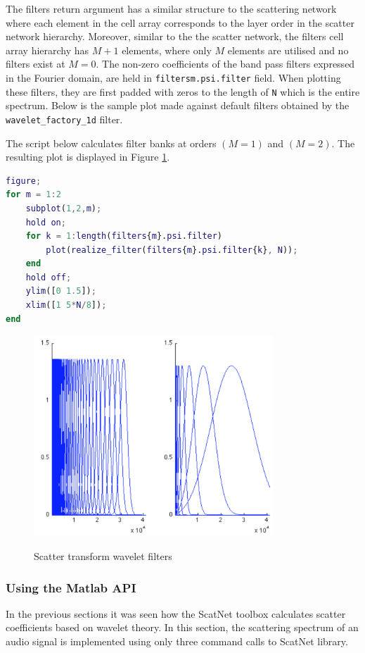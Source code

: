 The filters return argument has a similar structure to the scattering network where each element in the cell array corresponds to the layer order in the scatter network hierarchy. Moreover, similar to the the scatter network, the filters cell array hierarchy has $M+1$ elements, where only $M$ elements are utilised and no filters exist at $M=0$. The non-zero coefficients of the band pass filters expressed in the Fourier domain, are held in \texttt{filters{m}.psi.filter} field. When plotting these filters, they are first padded with zeros to the length of \texttt{N} which is the entire spectrum.  Below is the sample plot made against default filters obtained by the \texttt{wavelet\_factory\_1d} filter.

The script below calculates filter banks at orders $(M = 1)$ and $(M = 2)$.  The resulting plot is displayed in Figure \ref{fig_c3_wplot}.

\begin{lstlisting}[language=Matlab]
figure;
for m = 1:2
    subplot(1,2,m);
    hold on;
    for k = 1:length(filters{m}.psi.filter)
        plot(realize_filter(filters{m}.psi.filter{k}, N));
    end
    hold off;
    ylim([0 1.5]);
    xlim([1 5*N/8]);
end
\end{lstlisting}

\begin{figure}
\centering
  \includegraphics[width=9cm]{thesis/images/wfplot}\\
  \caption{Scatter transform wavelet filters}\label{fig_c3_wplot}
\end{figure}

\subsubsection{Using the Matlab API}\label{sec_c3_scat02}
In the previous sections it was seen how the ScatNet toolbox calculates scatter coefficients based on wavelet theory.  In this section, the scattering spectrum of an audio signal is implemented using only three command calls to ScatNet library.

